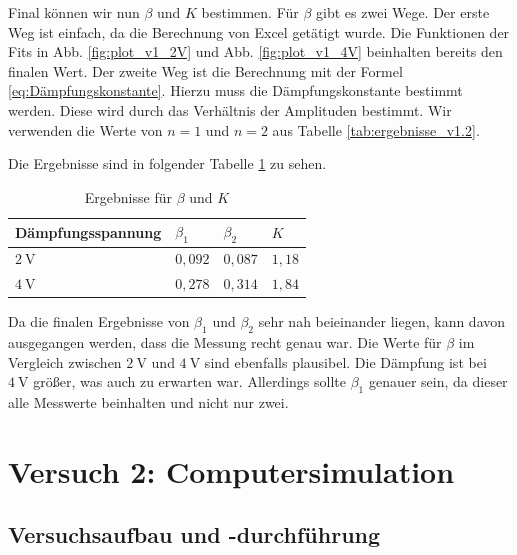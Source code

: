             Final können wir nun $\beta$ und $K$ bestimmen. Für $\beta$ gibt es zwei Wege. Der erste Weg ist einfach, da die Berechnung von Excel getätigt wurde. Die Funktionen der Fits in Abb. \ref{fig:plot_v1_2V} und Abb. \ref{fig:plot_v1_4V} beinhalten bereits den finalen Wert. Der zweite Weg ist die Berechnung mit der Formel \ref{eq:Dämpfungskonstante}. Hierzu muss die Dämpfungskonstante bestimmt werden. Diese wird durch das Verhältnis der Amplituden bestimmt. Wir verwenden die Werte von $n = 1$ und $n = 2$ aus Tabelle \ref{tab:ergebnisse_v1.2}.

            Die Ergebnisse sind in folgender Tabelle \ref{tab:ergebnisse_v1.2_final} zu sehen.

            \begin{table}[H]
                \centering
                \caption{Ergebnisse für $\beta$ und $K$}
                \vspace{0.5em}
                \begin{tabular}{|l|l|l|l|}
                    \hline
                    Dämpfungsspannung & $\beta_{1}$& $\beta_{2}$ & $K$\\
                    \hline
                    \hline
                    $2\ \mathrm{V}$ & $0,092$ & $0,087$ & $1,18$\\
                    \hline
                    $4\ \mathrm{V}$ & $0,278$ & $0,314$ & $1,84$\\
                    \hline
                \end{tabular}
                \label{tab:ergebnisse_v1.2_final}
            \end{table}

            Da die finalen Ergebnisse von $\beta_{1}$ und $\beta_{2}$ sehr nah beieinander liegen, kann davon ausgegangen werden, dass die Messung recht genau war. Die Werte für $\beta$ im Vergleich zwischen $2\ \mathrm{V}$ und $4\ \mathrm{V}$ sind ebenfalls plausibel. Die Dämpfung ist bei $4\ \mathrm{V}$ größer, was auch zu erwarten war. Allerdings sollte $\beta_{1}$ genauer sein, da dieser alle Messwerte beinhalten und nicht nur zwei.


\section{Versuch 2: Computersimulation}

    \subsection{Versuchsaufbau und -durchführung}

